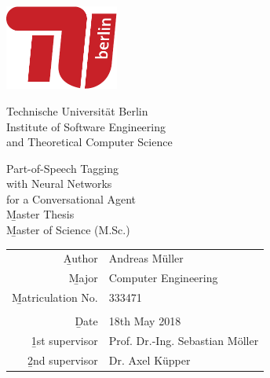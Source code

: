 
\pagestyle{empty}

\begin{center}
\includegraphics[width=0.28\textwidth]{images/logo_tu_berlin}
\vspace{8mm}

{\huge Technische Universität Berlin}\\
\vspace{2mm}
{\large Institute of Software Engineering\\and Theoretical Computer Science}\\
\vspace{11mm}

{\Huge Part-of-Speech Tagging\\[-2mm] with Neural Networks\\[-2mm] for a Conversational Agent\\}
\vspace{20mm}
{\Huge \b{Master Thesis}}\\
{\b{Master of Science (M.Sc.)}}\\
\vspace{24mm}
\begin{tabular}{rl}
  \b{Author} & Andreas Müller\\
  \b{Major} & Computer Engineering\\
  \b{Matriculation No.} & 333471\\
   & \\
  \b{Date} & 18th May 2018 \\
  \b{1st supervisor} & Prof. Dr.-Ing. Sebastian Möller \\
  \b{2nd supervisor} & Dr. Axel Küpper \\
\end{tabular}

\end{center}
\clearpage
\pagestyle{scrheadings} %

